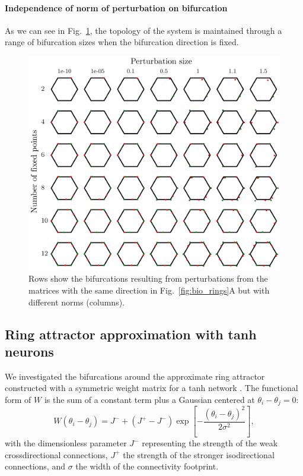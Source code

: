 \documentclass{article} %
\newcounter{ct}
\theoremstyle{definition}
\theoremstyle{remark}
\begin{document}
\paragraph{Independence of norm of perturbation on bifurcation}
As we can see in Fig.~\ref{fig:noorman_ring_allfxdpnts_allnorm}, the topology of the system is maintained through a range of bifurcation sizes when the bifurcation direction is fixed.
\begin{figure}[tbhp]
     \centering
    \includegraphics[width=\textwidth]{noorman_ring_N6_pert_allfxdpnts_allnorms}
       \caption{Rows show the bifurcations resulting from perturbations from the matrices with the same direction in Fig.~\ref{fig:bio_rings}A but with different norms (columns). }\label{fig:noorman_ring_allfxdpnts_allnorm}
\end{figure}






\newpage
\subsection{Ring attractor approximation with tanh neurons}\label{sec:supp:goodridge}


We investigated the bifurcations around the approximate ring attractor constructed with a symmetric weight matrix for a tanh network  \citep{compte2000synaptic, seeholzer2017efficient}.
The functional form of \(W\) is the sum of a constant term plus a Gaussian centered at \(\theta_{i} - \theta_{j} = 0\):
\begin{equation}
W(\theta_{i} - \theta_{j}) = J^- + (J^+ - J^-) \exp\left[ -\frac{(\theta_{i} - \theta_{j})^{2}}{2\sigma^{2}} \right],
\end{equation}with the dimensionless parameter \(J^-\) representing the strength of the weak crossdirectional connections, \(J^+\) the strength of the stronger isodirectional connections,
 and \(\sigma\) the width of the connectivity footprint.
\end{document}
